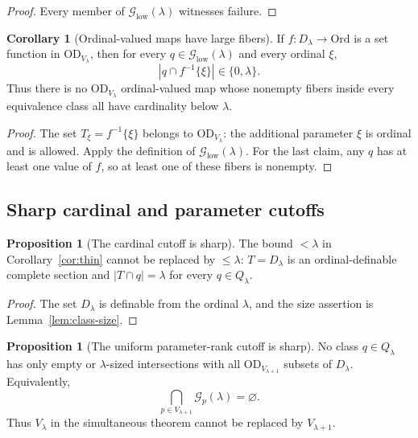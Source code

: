 \documentclass[11pt,letterpaper]{article}
\theoremstyle{definition}
\newtheorem{proposition}[definition]{Proposition}
\newtheorem{corollary}[definition]{Corollary}
\newcommand{\OD}{\mathrm{OD}}
\newcommand{\Ord}{\mathrm{Ord}}
\numberwithin{equation}{section}
\newcommand{\Good}{\mathcal G}
\begin{document}
\begin{proof}
Every member of $\Good_{\mathrm{low}}(\lambda)$ witnesses failure.
\end{proof}

\begin{corollary}[Ordinal-valued maps have large fibers]\label{cor:coloring}
If $f:D_\lambda\to\Ord$ is a set function in $\OD_{V_\lambda}$, then for every
$q\in\Good_{\mathrm{low}}(\lambda)$ and every ordinal $\xi$,
\[
        |q\cap f^{-1}\{\xi\}|\in\{0,\lambda\}.
\]
Thus there is no $\OD_{V_\lambda}$ ordinal-valued map whose nonempty fibers
inside every equivalence class all have cardinality below $\lambda$.
\end{corollary}

\begin{proof}
The set $T_\xi=f^{-1}\{\xi\}$ belongs to $\OD_{V_\lambda}$: the additional parameter
$\xi$ is ordinal and is allowed. Apply the definition of $\Good_{\mathrm{low}}(\lambda)$.
For the last claim, any $q$ has at least one value of $f$, so at least one of
these fibers is nonempty.
\end{proof}

\subsection{Sharp cardinal and parameter cutoffs}

\begin{proposition}[The cardinal cutoff is sharp]\label{prop:cutoff}
The bound $<\lambda$ in Corollary~\ref{cor:thin} cannot be replaced by
$\le\lambda$: $T=D_\lambda$ is an ordinal-definable complete section and
$|T\cap q|=\lambda$ for every $q\in Q_\lambda$.
\end{proposition}

\begin{proof}
The set $D_\lambda$ is definable from the ordinal $\lambda$, and the size
assertion is Lemma~\ref{lem:class-size}.
\end{proof}

\begin{proposition}[The uniform parameter-rank cutoff is sharp]\label{prop:parameter-cutoff}
No class $q\in Q_\lambda$ has only empty or $\lambda$-sized intersections
with all $\OD_{V_{\lambda+1}}$ subsets of $D_\lambda$. Equivalently,
\[
                       \bigcap_{p\in V_{\lambda+1}}\Good_p(\lambda)=\varnothing.
\]
Thus $V_\lambda$ in the simultaneous theorem cannot be replaced by
$V_{\lambda+1}$.
\end{proposition}
\end{document}
